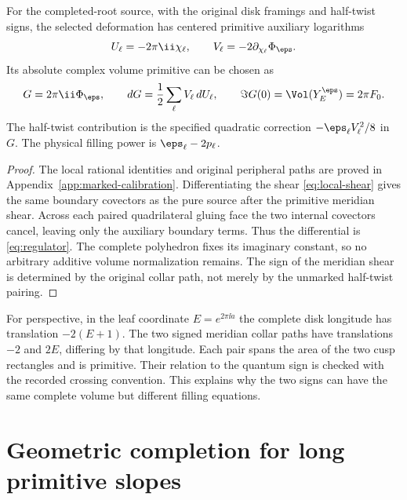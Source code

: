 \begin{proposition}\label{prop:marked-primitive}
For the completed-root source, with the original disk framings and half-twist signs, the selected deformation has centered primitive auxiliary logarithms
\begin{equation}\label{eq:UV}
 U_\ell=-2\pi\ii\chi_\ell,\qquad
 V_\ell=-2\partial_{\chi_\ell}\Phi_\eps.
\end{equation}
Its absolute complex volume primitive can be chosen as
\begin{equation}\label{eq:regulator}
 G=2\pi\ii\Phi_\eps,
 \qquad dG=\frac12\sum_\ell V_\ell\,dU_\ell,
 \qquad \Im G(0)=\Vol(Y_E^\eps)=2\pi F_0.
\end{equation}
The half-twist contribution is the specified quadratic correction $-\eps_\ell V_\ell^2/8$ in $G$. The physical filling power is $\eps_\ell-2p_\ell$.
\end{proposition}
\begin{proof}
The local rational identities and original peripheral paths are proved in Appendix~\ref{app:marked-calibration}. Differentiating the shear \eqref{eq:local-shear} gives the same boundary covectors as the pure source after the primitive meridian shear. Across each paired quadrilateral gluing face the two internal covectors cancel, leaving only the auxiliary boundary terms. Thus the differential is \eqref{eq:regulator}. The complete polyhedron fixes its imaginary constant, so no arbitrary additive volume normalization remains. The sign of the meridian shear is determined by the original collar path, not merely by the unmarked half-twist pairing.
\end{proof}

For perspective, in the leaf coordinate $E=e^{2\pi\ii a}$ the complete disk longitude has translation $-2(E+1)$. The two signed meridian collar paths have translations $-2$ and $2E$, differing by that longitude. Each pair spans the area of the two cusp rectangles and is primitive. Their relation to the quantum sign is checked with the recorded crossing convention. This explains why the two signs can have the same complete volume but different filling equations.

\section{Geometric completion for long primitive slopes}

